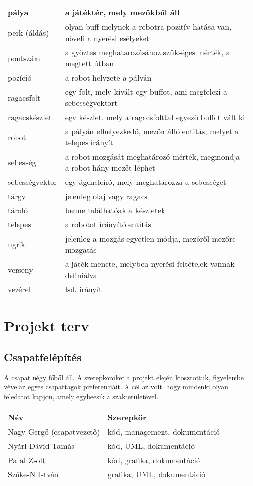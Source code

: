 \begin{tabularx}{\textwidth}{| l | l |}
    pálya &  a játéktér, mely mezőkből áll \tabularnewline \hline
    perk (áldás) & olyan buff melynek a robotra pozitív hatása van, növeli a nyerési esélyeket  \tabularnewline \hline
    pontszám &  a győztes meghatározásához szükséges mérték, a megtett útban \tabularnewline \hline
    pozíció &  a robot helyzete a pályán \tabularnewline \hline
    ragacsfolt &  egy folt, mely kivált egy buffot, ami megfelezi a sebességvektort \tabularnewline \hline
    ragacskészlet &  egy készlet, mely a ragacsfolttal egyező buffot vált ki \tabularnewline \hline
    robot &  a pályán elhelyezkedő, mezőn álló entitás, melyet a telepes irányít \tabularnewline \hline
    sebesség &  a robot mozgását meghatározó mérték, megmondja a robot hány mezőt léphet \tabularnewline \hline
    sebességvektor &  egy ágensleíró, mely meghatározza a sebességet \tabularnewline \hline
    tárgy & jelenleg olaj vagy ragacs   \tabularnewline \hline
    tároló &  benne találhatóak a készletek \tabularnewline \hline
    telepes &  a robotot irányító entitás \tabularnewline \hline
    ugrik &  jelenleg a mozgás egyetlen módja, mezőről-mezőre mozgatás \tabularnewline \hline
    verseny &  a játék menete, melyben nyerési feltételek vannak definiálva \tabularnewline \hline
    vezérel & lsd. irányít \tabularnewline \hline
\end{tabularx}

\section{Projekt terv}
\subsection{Csapatfelépítés}
A csapat négy főből áll. A szerepköröket a projekt elején kiosztottuk, figyelembe véve az egyes csapattagok preferenciáit. A cél az volt, hogy mindenki olyan feledatot kapjon, amely egybeesik a szakterületével.

\begin{tabularx}{\textwidth}{| l | l |}
\hline
\textbf{Név} & \textbf{Szerepkör} \tabularnewline 
\hline\hline
\endhead
Nagy Gergő (csapatvezető) & kód, management, dokumentáció \tabularnewline \hline
Nyári Dávid Tamás & kód, UML, dokumentáció \tabularnewline \hline
Paral Zsolt & kód, grafika, dokumentáció \tabularnewline \hline
Szőke-N István & grafika, UML, dokumentáció \tabularnewline \hline
\end{tabularx}

